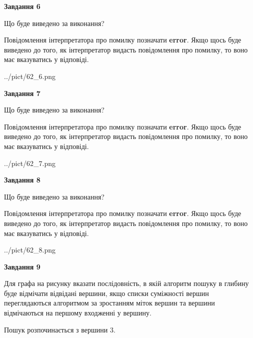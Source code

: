 \documentclass[12pt, ukrainian]{article}
\begin{document}
{\begin {large}
{\begin {center}\textbf{Завдання 6}\end {center}}\par
Що буде виведено за виконання?

Повідомлення інтерпретатора про помилку позначати \textbf{error}.
Якщо щось буде виведено до того, як інтерпретатор видасть повідомлення про помилку, 
то воно має вказуватись у відповіді. \par


\begin{center}
	{../pict/62_6.png}
\end{center}
\newpage

{\begin {center}\textbf{Завдання 7}\end {center}}\par
Що буде виведено за виконання?

Повідомлення інтерпретатора про помилку позначати \textbf{error}.
Якщо щось буде виведено до того, як інтерпретатор видасть повідомлення про помилку, 
то воно має вказуватись у відповіді. \par


\begin{center}
	{../pict/62_7.png}
\end{center}
\newpage

{\begin {center}\textbf{Завдання 8}\end {center}}\par
Що буде виведено за виконання?

Повідомлення інтерпретатора про помилку позначати \textbf{error}.
Якщо щось буде виведено до того, як інтерпретатор видасть повідомлення про помилку, 
то воно має вказуватись у відповіді. \par


\begin{center}
	{../pict/62_8.png}
\end{center}
\newpage

{\begin {center}\textbf{Завдання 9}\end {center}}\par
Для графа на рисунку вказати послідовність, в якій алгоритм пошуку в глибину буде відмічати відвідані вершини, якщо списки суміжності вершин переглядаються алгоритмом за зростанням міток вершин та вершини відмічаються на першому вход\-женні у вершину.\par
Пошук розпочинається з вершини 3.\par


\end{large}}
\end{document}
